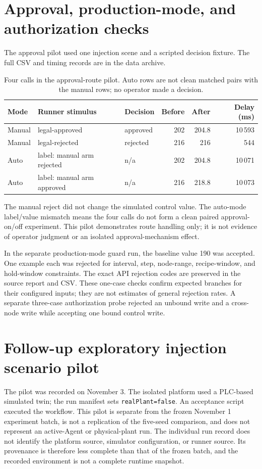 \documentclass[10pt]{article}
\begin{document}
\section*{Approval, production-mode, and authorization checks}
The approval pilot used one injection scene and a scripted decision fixture. The full CSV and timing records are in the data archive.

\begin{table}[htbp]
\centering
\caption{Four calls in the approval-route pilot. Auto rows are not clean matched pairs with the manual rows; no operator made a decision.}
\begin{tabularx}{\textwidth}{@{}l X l r r r@{}}
\toprule
Mode & Runner stimulus & Decision & Before & After & Delay (ms) \\
\midrule
Manual & legal-approved & approved & 202 & 204.8 & 10\,593 \\
Manual & legal-rejected & rejected & 216 & 216 & 544 \\
Auto & label: manual arm rejected & n/a & 202 & 204.8 & 10\,071 \\
Auto & label: manual arm approved & n/a & 216 & 218.8 & 10\,073 \\
\bottomrule
\end{tabularx}
\end{table}

The manual reject did not change the simulated control value. The auto-mode label/value mismatch means the four calls do not form a clean paired approval-on/off experiment. This pilot demonstrates route handling only; it is not evidence of operator judgment or an isolated approval-mechanism effect.

In the separate production-mode guard run, the baseline value 190 was accepted. One example each was rejected for interval, step, node-range, recipe-window, and hold-window constraints. The exact API rejection codes are preserved in the source report and CSV. These one-case checks confirm expected branches for their configured inputs; they are not estimates of general rejection rates. A separate three-case authorization probe rejected an unbound write and a cross-node write while accepting one bound control write.

\section*{Follow-up exploratory injection scenario pilot}
The pilot was recorded on November 3. The isolated
platform used a PLC-based simulated twin; the run manifest sets
\texttt{realPlant=false}. An acceptance script executed the workflow. This
pilot is separate from the frozen November 1 experiment batch, is not a
replication of the five-seed comparison, and does not represent an active-Agent
or physical-plant run.
The individual run record does not identify the platform source, simulator configuration, or runner source. Its provenance is therefore less complete than that of the frozen batch, and the recorded environment is not a complete runtime snapshot.
\end{document}
